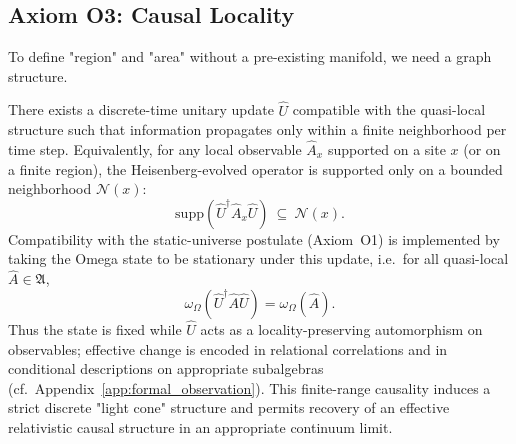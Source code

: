 \subsection{Axiom O3: Causal Locality}
To define "region" and "area" without a pre-existing manifold, we need a graph structure.
\begin{axiom}
There exists a discrete-time unitary update $\hat{U}$ compatible with the quasi-local structure such that information propagates only within a finite neighborhood per time step. Equivalently, for any local observable $\hat{A}_x$ supported on a site $x$ (or on a finite region), the Heisenberg-evolved operator is supported only on a bounded neighborhood $\mathcal{N}(x)$:
\begin{equation}
    \mathrm{supp}\!\left(\hat{U}^\dagger \hat{A}_x \hat{U}\right)\ \subseteq\ \mathcal{N}(x).
\end{equation}
Compatibility with the static-universe postulate (Axiom~O1) is implemented by taking the Omega state to be stationary under this update, i.e.\ for all quasi-local $\hat{A}\in\mathfrak{A}$,
\begin{equation}
    \omega_\Omega(\hat{U}^\dagger \hat{A}\hat{U})=\omega_\Omega(\hat{A}).
\end{equation}
Thus the state is fixed while $\hat{U}$ acts as a locality-preserving automorphism on observables; effective change is encoded in relational correlations and in conditional descriptions on appropriate subalgebras (cf.\ Appendix~\ref{app:formal_observation}).
This finite-range causality induces a strict discrete "light cone" structure and permits recovery of an effective relativistic causal structure in an appropriate continuum limit.
\end{axiom}

